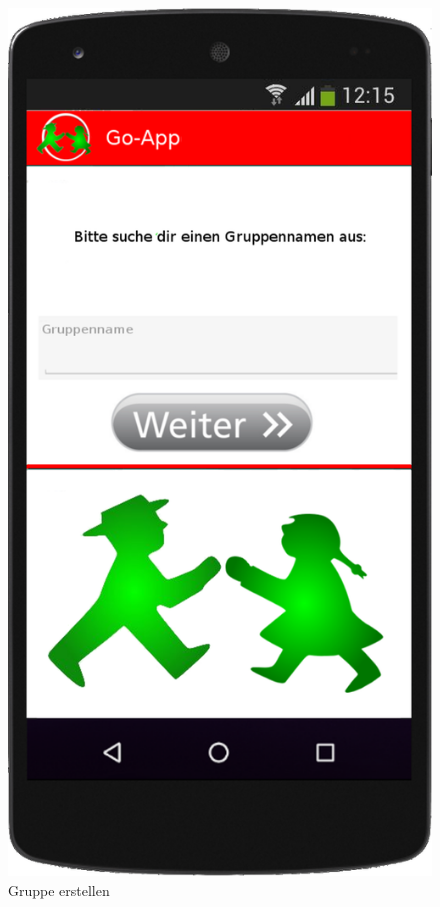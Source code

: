 \begin{figure}
	\caption{Gruppe erstellen}
	\includegraphics[scale =0.2]{resources/images/handy/gruppe_erstellen.png}
\end{figure}

